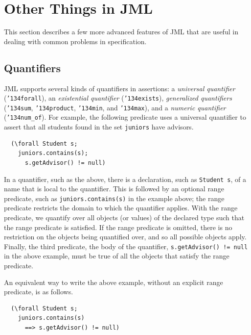 \documentclass[twocolumn]{article}
\begin{document}
\section{Other Things in JML}

This section describes a few more advanced features of JML that are
useful in dealing with common problems in specification.

\def\FORALL{\texttt{\char'134forall}}
\def\EXISTS{\texttt{\char'134exists}} 
\def\SUM{\texttt{\char'134sum}}
\def\PRODUCT{\texttt{\char'134product}}
\def\MIN{\texttt{\char'134min}} 
\def\MAX{\texttt{\char'134max}}
\def\NUMOF{\texttt{\char'134num\_of}}

\subsection{Quantifiers}
\label{sect-quantifiers}

JML supports several kinds of quantifiers in assertions: a
\emph{universal quantifier} (\FORALL), an \emph{existential
  quantifier} (\EXISTS), \emph{generalized quantifiers} ({\SUM},
{\PRODUCT}, {\MIN}, and {\MAX}), and a \emph{numeric quantifier}
(\NUMOF).  For example,
the following predicate uses a universal quantifier to assert that all students
found in the set \texttt{juniors} have advisors.

\begin{verbatim}
  (\forall Student s; 
    juniors.contains(s); 
      s.getAdvisor() != null)
\end{verbatim}

In a quantifier, such as the above, there is a declaration,
such as \texttt{Student s}, of a name that is local to the quantifier.
This is followed by an optional range predicate,
such as \texttt{juniors.contains(s)} in the example above;
the range predicate restricts the domain to which the
quantifier applies.
With the range predicate, we quantify over all objects (or values) of
the declared type such that the range predicate is satisfied.
If the range predicate is omitted, there is no restriction on the
objects being quantified over, and so all possible objects apply.
Finally, the third predicate, the body of the quantifier, 
\texttt{s.getAdvisor() != null} in the above example, must be true of
all the objects that satisfy the range predicate.

An equivalent way to write the above example, without an explicit range
predicate, is as follows.

\begin{verbatim}
  (\forall Student s; 
    juniors.contains(s) 
      ==> s.getAdvisor() != null)
\end{verbatim}
\end{document}
